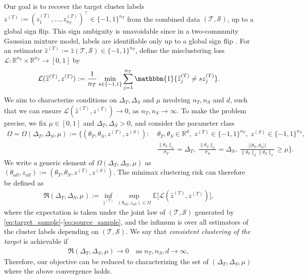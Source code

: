\documentclass[10pt]{article}
\newcommand{\R}{\mathbb R}
\newcommand{\Ebb}{\mathbb E}
\newcommand{\ip}[2]{\langle #1,#2\rangle}
\newcommand{\norm}[1]{\lVert #1\rVert}
\newcommand{\wh}{\widehat}
\newcommand{\calL}{\mathcal L}
\newcommand{\calT}{\mathcal T}
\newcommand{\trg}{T}
\newcommand{\thetaT}{\theta_{\trg}}
\newcommand{\nT}{n_{\trg}}
\newcommand{\sigmaT}{\sigma_{\trg}}
\newcommand{\ztar}{z^{(\trg)}}
\newcommand{\hatztar}{\wh{z}^{(\trg)}}
\newcommand{\DeltaT}{\Delta_{\trg}}
\newcommand{\calS}{\mathcal S}
\newcommand{\src}{S}
\newcommand{\thetaS}{\theta_{\src}}
\newcommand{\nS}{n_{\src}}
\newcommand{\sigmaS}{\sigma_{\src}}
\newcommand{\zsrc}{z^{(\src)}}
\newcommand{\DeltaS}{\Delta_{\src}}
\begin{document}
Our goal is to recover the target cluster labels $\ztar :=
(\ztar_1, \ldots, \ztar_{\nT})^\top \in \{-1, 1\}^{\nT}$ from the combined data $(\calT, \calS)$, up to a global sign flip. This sign ambiguity is unavoidable since in a two-community Gaussian mixture model, labels are identifiable only up to a global sign flip \citep{li2017minimax,Ndaoud2022}. For an estimator $\hatztar := \wh{z}(\calT, \calS) \in \{-1, 1\}^{\nT}$, define the misclustering loss $\calL : \R^{\nT} \times \R^{\nT} \to [0,1]$ by
\begin{align}
    \label{eq:loss_func_2}
    \calL(\hatztar, \ztar) :=
    \frac{1}{\nT} \min_{s \in \{-1, 1\}}
    \sum_{j=1}^{\nT} \mathbbm{1}\{\hatztar_j \neq s \ztar_j\}.
\end{align}
We aim to characterize conditions on $\DeltaT,\DeltaS$ and $\mu$ involving $\nT,\nS$ and $d$, such that we can ensure $\calL(\hatztar, \ztar) \to 0$, as $\nT,\nS \to \infty$. 
To make the problem precise, we fix $\mu \in [0, 1]$ and $\DeltaT,\DeltaS > 0$, and consider the parameter class
\begin{align}
    \label{eq:param_class}
    \Omega = \Omega(\DeltaT, \DeltaS, \mu)
    := \biggl\{(\thetaT, \thetaS, \ztar, \zsrc) :
    &\; \thetaT, \thetaS \in \R^d,\;
    \ztar \in \{-1,1\}^{\nT},\;
    \zsrc \in \{-1,1\}^{\nS}, \\
    &\; \frac{\norm{\thetaT}_2}{\sigmaT} = \DeltaT,\;
    \frac{\norm{\thetaS}_2}{\sigmaS} = \DeltaS,\;
    \frac{|\ip{\thetaT}{\thetaS}|}{\norm{\thetaT}_2 \norm{\thetaS}_2}
    \geq \mu \biggr\}. \nonumber
\end{align}
We write a generic element of $\Omega(\DeltaT, \DeltaS, \mu)$ as
$(\theta_{all},z_{all}) := (\thetaT, \thetaS, \ztar, \zsrc)$. 
The minimax clustering risk can therefore be defined as
\begin{align}
    \label{eq:minimax_risk}
    \mathfrak{R}(\DeltaT, \DeltaS, \mu)
    := \inf_{\hatztar} \sup_{(\theta_{all},z_{all}) \in \Omega}
    \Ebb\bigl[\calL(\hatztar, \ztar)\bigr],
\end{align}
where the expectation is taken under the joint law of $(\calT, \calS)$
generated by \eqref{eq:target_sample}-\eqref{eq:source_sample}, and the
infimum is over all estimators of the cluster labels depending on $(\calT,
\calS)$. We say that \emph{consistent clustering of the target} is
achievable if
\begin{align}
\label{eq:consistent_clustering_definition}
    \mathfrak{R}(\DeltaT, \DeltaS, \mu) \to 0
    \quad \text{as } \nT, \nS, d \to \infty,
\end{align}
Therefore, our objective can be reduced to characterizing the set of $(\Delta_T,\Delta_S,\mu)$ where the above convergence holds.
\end{document}
